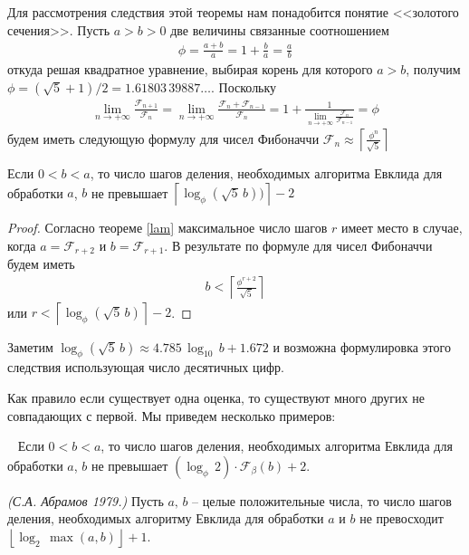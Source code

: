 \documentclass[14pt]{extreport}
\begin{document}
Для рассмотрения следствия этой теоремы нам понадобится
понятие <<золотого сечения>>. Пусть $a > b > 0$ две величины
связанные соотношением
\begin{eqnarray*}
 \phi = \frac{a+b}{a} = 1 + \frac{b}{a} = \frac{a}{b}
\end{eqnarray*}
откуда решая квадратное уравнение,
выбирая корень для
которого $a > b$, получим $\phi = (\sqrt{5} + 1)/2 = 1.61803\, 39887 \ldots$.
Поскольку
\begin{eqnarray*}
 \lim_{n \to +\infty}\frac{\mathcal{F}_{n+1}}{\mathcal{F}_{n}} =
 \lim_{n \to +\infty}\frac{\mathcal{F}_{n} + \mathcal{F}_{n-1}}{\mathcal{F}_{n}}=
 1+ \frac{1}{\lim_{n \to +\infty}\frac{\mathcal{F}_{n}}{\mathcal{F}_{n-1}}}= \phi
\end{eqnarray*}
будем иметь следующую формулу для чисел Фибоначчи
$ \displaystyle
\mathcal{F}_{n}  \approx \left\lceil \frac{\phi^n}{\sqrt{5}}\right\rceil
$
\begin{corollary}
Если $0 < b < a$, то число шагов деления,
необходимых алгоритма Евклида для обработки
$a$, $b$ не превышает
$\left\lceil \log_\phi(\sqrt{5}\, b)) \right\rceil - 2$
\label{lame}
\end{corollary}
\begin{proof}
Согласно теореме \ref{lam} максимальное число шагов  $r$ имеет
место в случае, когда $a =\mathcal{F}_{r+2}$ и $b =\mathcal{F}_{r+1}$.
В результате по формуле для чисел Фибоначчи будем иметь
\begin{eqnarray*}
b < \left\lceil \frac{\phi^{r+2}}{\sqrt{5}}\right\rceil
\end{eqnarray*}
или $r < \left\lceil \log_\phi(\sqrt{5}\, b) \right\rceil - 2$.
\end{proof}
Заметим $\log_\phi(\sqrt{5}\, b) \approx 4.785 \, \log_{10} \, b + 1.672$
и возможна формулировка этого следствия использующая число десятичных цифр.

Как правило если существует одна оценка, то существуют много других
не совпадающих с первой. Мы приведем несколько примеров:
\begin{theorem}~\cite{DBLP:journals/ipl/CollinsM77}
Если $0 < b < a$, то число шагов деления,
необходимых алгоритма Евклида для обработки
$a$, $b$ не превышает
$(\log_\phi \, 2)\cdot \mathcal{F}_\beta(b)  + 2$.
\end{theorem}
\begin{theorem}\emph{(С.А. Абрамов 1979.)}
Пусть $a,\, b$ -- целые положительные числа, то число шагов деления,
необходимых алгоритму Евклида для обработки
$a$ и $b$ не превосходит
$\left\lfloor \log_2 \, \max(a, b) \right\rfloor + 1$.
\end{theorem}
\end{document}
